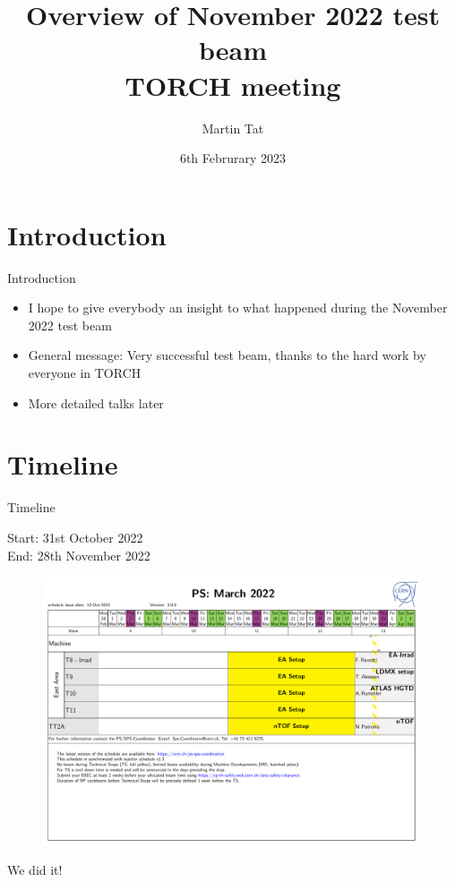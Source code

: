 \documentclass[xcolor = table]{beamer}
\title[TORCH meeting]{Overview of November 2022 test beam\\TORCH meeting}
\author{Martin Tat}
\institute{University of Oxford}
\date{6th Februrary 2023}
\begin{document}
\begin{frame}
  \titlepage
\end{frame}


\section{Introduction}
\begin{frame}{Introduction}
  \begin{itemize}
    \setlength\itemsep{2.0em}
    \item{I hope to give everybody an insight to what happened during the November 2022 test beam}
    \item{General message: Very successful test beam, thanks to the hard work by everyone in TORCH}
    \item{More detailed talks later}
  \end{itemize}
\end{frame}

\section{Timeline}
\begin{frame}{Timeline}
  \begin{center}
    \large Start: 31st October 2022\\
    \large End: 28th November 2022
  \end{center}
  \vspace{-0.5cm}
  \begin{figure}
    \centering
    \includegraphics[width = 1.0\textwidth,trim={0 8.5cm 0 0 0},clip=true,page=9]{Plots/PSDetailedSchedule_v3_0_0.pdf}
  \end{figure}
  \vspace{-0.2cm}
  \begin{center}
    \huge We did it!
  \end{center}
\end{frame}
\end{document}
